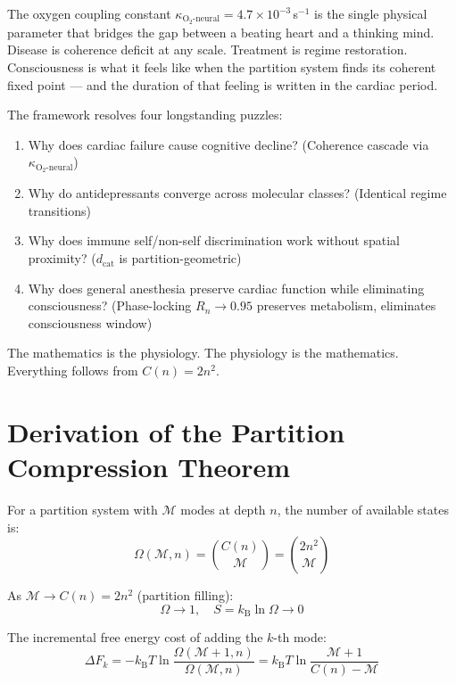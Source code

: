 \documentclass[12pt,a4paper]{article}
\theoremstyle{definition}
\newcommand{\kB}{k_{\text{B}}}
\newcommand{\kBT}{k_{\text{B}}T}
\newcommand{\dcat}{d_{\text{cat}}}
\begin{document}
The oxygen coupling constant $\kappa_{\text{O}_2\text{-neural}} = 4.7 \times 10^{-3}$\,s$^{-1}$
is the single physical parameter that bridges the gap between a beating heart
and a thinking mind. Disease is coherence deficit at any scale. Treatment is
regime restoration. Consciousness is what it feels like when the partition
system finds its coherent fixed point — and the duration of that feeling is
written in the cardiac period.

The framework resolves four longstanding puzzles:
\begin{enumerate}
\item Why does cardiac failure cause cognitive decline? (Coherence cascade via $\kappa_{\text{O}_2\text{-neural}}$)
\item Why do antidepressants converge across molecular classes? (Identical regime transitions)
\item Why does immune self/non-self discrimination work without spatial proximity? ($\dcat$ is partition-geometric)
\item Why does general anesthesia preserve cardiac function while eliminating consciousness? (Phase-locking $R_n \to 0.95$ preserves metabolism, eliminates consciousness window)
\end{enumerate}

The mathematics is the physiology. The physiology is the mathematics.
Everything follows from $C(n) = 2n^2$.

\appendix

\section{Derivation of the Partition Compression Theorem}
\label{app:compression}

For a partition system with $\mathcal{M}$ modes at depth $n$, the number of
available states is:
\begin{equation}
\Omega(\mathcal{M}, n) = \binom{C(n)}{\mathcal{M}} = \binom{2n^2}{\mathcal{M}}
\end{equation}

As $\mathcal{M} \to C(n) = 2n^2$ (partition filling):
\begin{equation}
\Omega \to 1, \quad S = \kB \ln \Omega \to 0
\end{equation}

The incremental free energy cost of adding the $k$-th mode:
\begin{equation}
\Delta F_k = -\kBT \ln\frac{\Omega(\mathcal{M}+1,n)}{\Omega(\mathcal{M},n)}
= \kBT \ln\frac{\mathcal{M}+1}{C(n) - \mathcal{M}}
\end{equation}
\end{document}
